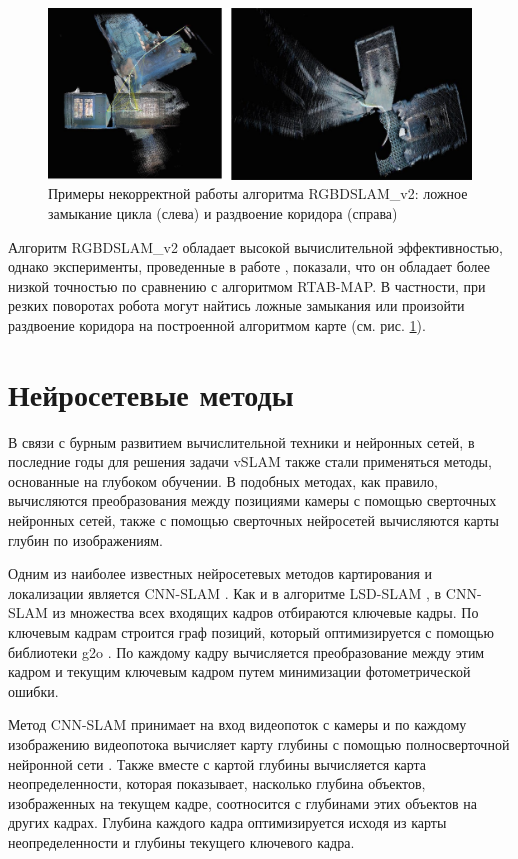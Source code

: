 \documentclass{mipt-thesis-ms}
\begin{document}
	\begin{figure}
		\includegraphics[width=1.0\textwidth]{img/rgbdslam_fails.png}
		\caption{Примеры некорректной работы алгоритма RGBDSLAM\_v2: ложное замыкание цикла (слева) и раздвоение коридора (справа)}
		\label{figure_rgbdslam_fails}
	\end{figure}
	
	Алгоритм RGBDSLAM\_v2 обладает высокой вычислительной эффективностью, однако эксперименты, проведенные в работе \cite{bokovoy2020map}, показали, что он обладает более низкой точностью по сравнению с алгоритмом RTAB-MAP. В частности, при резких поворотах робота могут найтись ложные замыкания или произойти раздвоение коридора на построенной алгоритмом карте (см. рис. \ref{figure_rgbdslam_fails}).
	
	\section{Нейросетевые методы}
	
	В связи с бурным развитием вычислительной техники и нейронных сетей, в последние годы для решения задачи vSLAM также стали применяться методы, основанные на глубоком обучении. В подобных методах, как правило, вычисляются преобразования между позициями камеры с помощью сверточных нейронных сетей, также с помощью сверточных нейросетей вычисляются карты глубин по изображениям.
	
	Одним из наиболее известных нейросетевых методов картирования и локализации является CNN-SLAM \cite{tateno2017cnn}.	Как и в алгоритме LSD-SLAM \cite{engel2014lsd}, в CNN-SLAM из множества всех входящих кадров отбираются ключевые кадры. По ключевым кадрам строится граф позиций, который оптимизируется с помощью библиотеки g2o \cite{grisetti2011g2o}. По каждому кадру вычисляется преобразование между этим кадром и текущим ключевым кадром путем минимизации фотометрической ошибки.
	
	Метод CNN-SLAM принимает на вход видеопоток с камеры и по каждому изображению видеопотока вычисляет карту глубины с помощью полносверточной нейронной сети \cite{laina2016deeper}. Также вместе с картой глубины вычисляется карта неопределенности, которая показывает, насколько глубина объектов, изображенных на текущем кадре, соотносится с глубинами этих объектов на других кадрах. Глубина каждого кадра оптимизируется исходя из карты неопределенности и глубины текущего ключевого кадра.
	 
\end{document}
